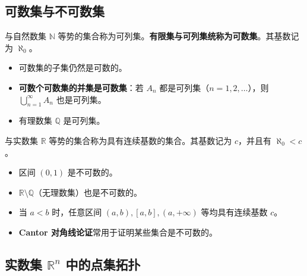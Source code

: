 \subsection{可数集与不可数集}

\begin{definition}[可数集]

与自然数集 $\mathbb{N}$ 等势的集合称为可列集。\textbf{有限集与可列集统称为可数集}。其基数记为 $\aleph_0$。

\end{definition}

\begin{itemize}
  \item {可数集的子集仍然是可数的。}\item {\textbf{可数个可数集的并集是可数集}：若 $A_n$ 都是可列集（$n=1,2,\dots$），则 $\displaystyle \bigcup_{n=1}^{\infty} A_n$ 也是可列集。}\item {有理数集 $\mathbb{Q}$ 是可列集。}
\end{itemize}

\begin{definition}[连续统]

与实数集 $\mathbb{R}$ 等势的集合称为具有连续基数的集合。其基数记为 $c$，并且有 $\aleph_0 < c$。

\end{definition}

\begin{itemize}
  \item {区间 $(0, 1)$ 是不可数的。

}\item {$\mathbb{R} \setminus \mathbb{Q}$（无理数集）也是不可数的。

}\item {当 $a < b$ 时，任意区间 $(a, b), [a, b], (a, +\infty)$ 等均具有连续基数 $c$。

}\item {\textbf{Cantor 对角线论证}常用于证明某些集合是不可数的。

}
\end{itemize}

\subsection{实数集 $\mathbb{R}^n$ 中的点集拓扑}


